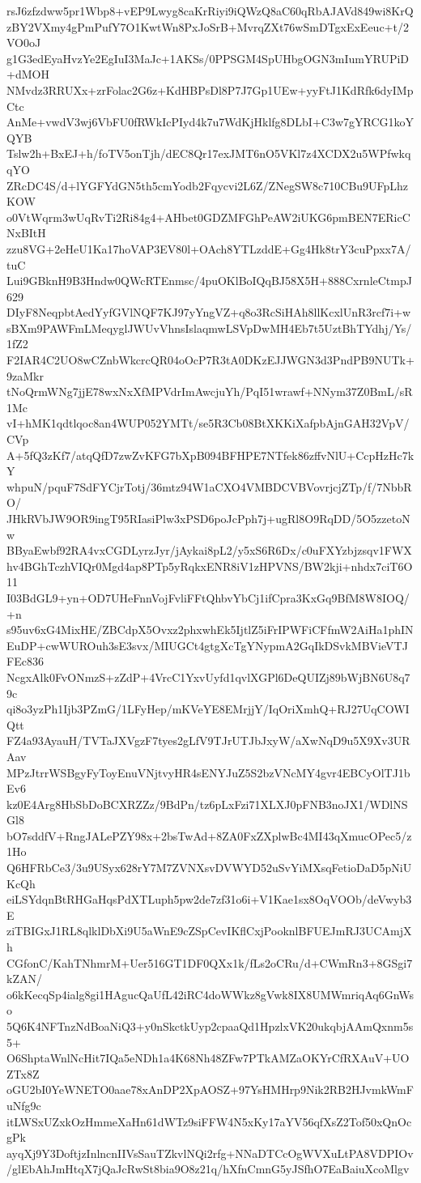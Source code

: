 rsJ6zfzdww5pr1Wbp8+vEP9Lwyg8caKrRiyi9iQWzQ8aC60qRbAJAVd849wi8KrQ
zBY2VXmy4gPmPufY7O1KwtWn8PxJoSrB+MvrqZXt76wSmDTgxExEeuc+t/2VO0oJ
g1G3edEyaHvzYe2EgIuI3MaJc+1AKSs/0PPSGM4SpUHbgOGN3mIumYRUPiD+dMOH
NMvdz3RRUXx+zrFolac2G6z+KdHBPsDl8P7J7Gp1UEw+yyFtJ1KdRfk6dyIMpCtc
AnMe+vwdV3wj6VbFU0fRWkIcPIyd4k7u7WdKjHklfg8DLbI+C3w7gYRCG1koYQYB
Tslw2h+BxEJ+h/foTV5onTjh/dEC8Qr17exJMT6nO5VKl7z4XCDX2u5WPfwkqqYO
ZRcDC4S/d+lYGFYdGN5th5cmYodb2Fqycvi2L6Z/ZNegSW8c710CBu9UFpLhzKOW
o0VtWqrm3wUqRvTi2Ri84g4+AHbet0GDZMFGhPeAW2iUKG6pmBEN7ERicCNxBItH
zzu8VG+2eHeU1Ka17hoVAP3EV80l+OAch8YTLzddE+Gg4Hk8trY3cuPpxx7A/tuC
Lui9GBknH9B3Hndw0QWcRTEnmsc/4puOKlBoIQqBJ58X5H+888CxrnleCtmpJ629
DIyF8NeqpbtAedYyfGVlNQF7KJ97yYngVZ+q8o3RcSiHAh8llKcxlUnR3rcf7i+w
sBXm9PAWFmLMeqyglJWUvVhnsIslaqmwLSVpDwMH4Eb7t5UztBhTYdhj/Ys/1fZ2
F2IAR4C2UO8wCZnbWkcrcQR04oOcP7R3tA0DKzEJJWGN3d3PndPB9NUTk+9zaMkr
tNoQrmWNg7jjE78wxNxXfMPVdrImAwcjuYh/PqI51wrawf+NNym37Z0BmL/sR1Mc
vI+hMK1qdtlqoc8an4WUP052YMTt/se5R3Cb08BtXKKiXafpbAjnGAH32VpV/CVp
A+5fQ3zKf7/atqQfD7zwZvKFG7bXpB094BFHPE7NTfek86zffvNlU+CcpHzHc7kY
whpuN/pquF7SdFYCjrTotj/36mtz94W1aCXO4VMBDCVBVovrjcjZTp/f/7NbbRO/
JHkRVbJW9OR9ingT95RIasiPlw3xPSD6poJcPph7j+ugRl8O9RqDD/5O5zzetoNw
BByaEwbf92RA4vxCGDLyrzJyr/jAykai8pL2/y5xS6R6Dx/c0uFXYzbjzsqv1FWX
hv4BGhTczhVIQr0Mgd4ap8PTp5yRqkxENR8iV1zHPVNS/BW2kji+nhdx7ciT6O11
I03BdGL9+yn+OD7UHeFnnVojFvliFFtQhbvYbCj1ifCpra3KxGq9BfM8W8IOQ/+n
s95uv6xG4MixHE/ZBCdpX5Ovxz2phxwhEk5IjtlZ5iFrIPWFiCFfmW2AiHa1phIN
EuDP+cwWUROuh3sE3svx/MIUGCt4gtgXcTgYNypmA2GqIkDSvkMBVieVTJFEc836
NcgxAlk0FvONmzS+zZdP+4VrcC1YxvUyfd1qvlXGPl6DeQUIZj89bWjBN6U8q79c
qi8o3yzPh1Ijb3PZmG/1LFyHep/mKVeYE8EMrjjY/IqOriXmhQ+RJ27UqCOWIQtt
FZ4a93AyauH/TVTaJXVgzF7tyes2gLfV9TJrUTJbJxyW/aXwNqD9u5X9Xv3URAav
MPzJtrrWSBgyFyToyEnuVNjtvyHR4sENYJuZ5S2bzVNcMY4gvr4EBCyOlTJ1bEv6
kz0E4Arg8HbSbDoBCXRZZz/9BdPn/tz6pLxFzi71XLXJ0pFNB3noJX1/WDlNSGl8
bO7sddfV+RngJALePZY98x+2bsTwAd+8ZA0FxZXplwBc4MI43qXmucOPec5/z1Ho
Q6HFRbCe3/3u9USyx628rY7M7ZVNXsvDVWYD52uSvYiMXsqFetioDaD5pNiUKcQh
eiLSYdqnBtRHGaHqsPdXTLuph5pw2de7zf31o6i+V1Kae1sx8OqVOOb/deVwyb3E
ziTBIGxJ1RL8qlklDbXi9U5aWnE9cZSpCevIKflCxjPooknlBFUEJmRJ3UCAmjXh
CGfonC/KahTNhmrM+Uer516GT1DF0QXx1k/fLs2oCRu/d+CWmRn3+8GSgi7kZAN/
o6kKecqSp4ialg8gi1HAgucQaUfL42iRC4doWWkz8gVwk8IX8UMWmriqAq6GnWso
5Q6K4NFTnzNdBoaNiQ3+y0nSkctkUyp2cpaaQd1HpzlxVK20ukqbjAAmQxnm5s5+
O6ShptaWnlNcHit7IQa5eNDh1a4K68Nh48ZFw7PTkAMZaOKYrCfRXAuV+UOZTx8Z
oGU2bI0YeWNETO0aae78xAnDP2XpAOSZ+97YsHMHrp9Nik2RB2HJvmkWmFuNfg9c
itLWSxUZxkOzHmmeXaHn61dWTz9siFFW4N5xKy17aYV56qfXsZ2Tof50xQnOcgPk
ayqXj9Y3DoftjzInlncnIIVsSauTZkvlNQi2rfg+NNaDTCcOgWVXuLtPA8VDPIOv
/glEbAhJmHtqX7jQaJcRwSt8bia9O8z21q/hXfnCmnG5yJSfhO7EaBaiuXcoMlgv
